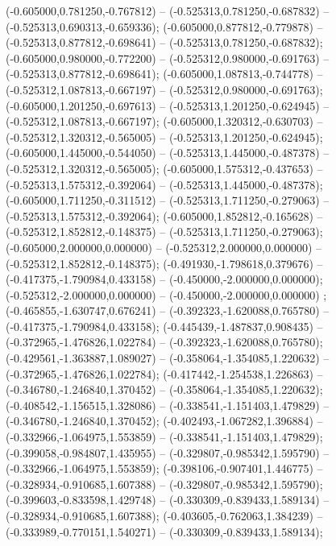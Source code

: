  (-0.605000,0.781250,-0.767812) -- (-0.525313,0.781250,-0.687832) -- (-0.525313,0.690313,-0.659336);
 (-0.605000,0.877812,-0.779878) -- (-0.525313,0.877812,-0.698641) -- (-0.525313,0.781250,-0.687832);
 (-0.605000,0.980000,-0.772200) -- (-0.525312,0.980000,-0.691763) -- (-0.525313,0.877812,-0.698641);
 (-0.605000,1.087813,-0.744778) -- (-0.525312,1.087813,-0.667197) -- (-0.525312,0.980000,-0.691763);
 (-0.605000,1.201250,-0.697613) -- (-0.525313,1.201250,-0.624945) -- (-0.525312,1.087813,-0.667197);
 (-0.605000,1.320312,-0.630703) -- (-0.525312,1.320312,-0.565005) -- (-0.525313,1.201250,-0.624945);
 (-0.605000,1.445000,-0.544050) -- (-0.525313,1.445000,-0.487378) -- (-0.525312,1.320312,-0.565005);
 (-0.605000,1.575312,-0.437653) -- (-0.525313,1.575312,-0.392064) -- (-0.525313,1.445000,-0.487378);
 (-0.605000,1.711250,-0.311512) -- (-0.525313,1.711250,-0.279063) -- (-0.525313,1.575312,-0.392064);
 (-0.605000,1.852812,-0.165628) -- (-0.525312,1.852812,-0.148375) -- (-0.525313,1.711250,-0.279063);
 (-0.605000,2.000000,0.000000) -- (-0.525312,2.000000,0.000000) -- (-0.525312,1.852812,-0.148375);
 (-0.491930,-1.798618,0.379676) -- (-0.417375,-1.790984,0.433158) -- (-0.450000,-2.000000,0.000000);
 (-0.525312,-2.000000,0.000000) -- (-0.450000,-2.000000,0.000000) ;
 (-0.465855,-1.630747,0.676241) -- (-0.392323,-1.620088,0.765780) -- (-0.417375,-1.790984,0.433158);
 (-0.445439,-1.487837,0.908435) -- (-0.372965,-1.476826,1.022784) -- (-0.392323,-1.620088,0.765780);
 (-0.429561,-1.363887,1.089027) -- (-0.358064,-1.354085,1.220632) -- (-0.372965,-1.476826,1.022784);
 (-0.417442,-1.254538,1.226863) -- (-0.346780,-1.246840,1.370452) -- (-0.358064,-1.354085,1.220632);
 (-0.408542,-1.156515,1.328086) -- (-0.338541,-1.151403,1.479829) -- (-0.346780,-1.246840,1.370452);
 (-0.402493,-1.067282,1.396884) -- (-0.332966,-1.064975,1.553859) -- (-0.338541,-1.151403,1.479829);
 (-0.399058,-0.984807,1.435955) -- (-0.329807,-0.985342,1.595790) -- (-0.332966,-1.064975,1.553859);
 (-0.398106,-0.907401,1.446775) -- (-0.328934,-0.910685,1.607388) -- (-0.329807,-0.985342,1.595790);
 (-0.399603,-0.833598,1.429748) -- (-0.330309,-0.839433,1.589134) -- (-0.328934,-0.910685,1.607388);
 (-0.403605,-0.762063,1.384239) -- (-0.333989,-0.770151,1.540271) -- (-0.330309,-0.839433,1.589134);
